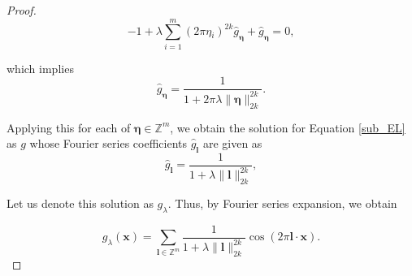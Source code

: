 \documentclass[multixcb]{amstext-l}
\theoremstyle{plain}
\theoremstyle{definition}
\theoremstyle{definition}
\theoremstyle{remark}
\numberwithin{equation}{chapter}
\begin{document}
\begin{proof}
\begin{equation}\label{eq19}
    -1 + \lambda\sum\limits_{i = 1}^m (2\pi \eta{_i})^{2k}\hat{g}_{\boldsymbol{\eta}} + \hat{g}_{\boldsymbol{\eta}} = 0, 
\end{equation}

which implies 
\begin{equation}\label{eq20}
    \hat{g}_{\boldsymbol{\eta}} = \frac{1}{1+2\pi\lambda\|\boldsymbol{\eta}\|_{2k}^{2k}}.  
\end{equation}

Applying this for each of $\boldsymbol{\eta} \in \mathbb{Z}^m$, we obtain the solution for Equation \ref{sub_EL} as $g$ whose Fourier series coefficients $\hat{g}_{\boldsymbol{l}}$ are given as \begin{equation}\label{eq21}
    \hat{g}_{\boldsymbol{l}} =  \frac{1}{1+\lambda\|\boldsymbol{l}\|_{2k}^{2k}}, %
\end{equation} 

Let us denote this solution as $g_{\lambda}$. Thus, by Fourier series expansion, we obtain 

\begin{equation}\label{eq22}
    g_{\lambda}(\boldsymbol{x}) =  \sum_{\boldsymbol{l}\in\mathbb{Z}^m} \frac{1}{1+\lambda\|\boldsymbol{l}\|_{2k}^{2k}} \cos{(2\pi\boldsymbol{l}\cdot\boldsymbol{x})}.
\end{equation}



\end{proof}
\end{document}
